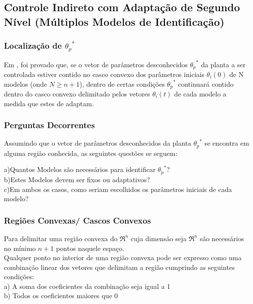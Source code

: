 \documentclass[aspectratio=169]{beamer}
\begin{document}
\subsection{Controle Indireto com Adaptação de Segundo Nível (Múltiplos Modelos de Identificação)}

\begin{frame}
\frametitle{Localização de ${\theta_p}^*$}

Em \cite{han1}, foi provado que, se o vetor de parâmetros desconhecidos ${\theta_p}^*$ da planta a ser controlada estiver contido no casco convexo dos parâmetros iniciais $\theta_i(0)$ de N modelos (onde $N\geq n+1$), dentro de certas condições ${\theta_p}^*$ continuará contido dentro do casco convexo delimitado pelos vetores $\theta_i(t)$ de cada modelo a medida que estes de adaptam.

\end{frame}

\begin{frame}
\frametitle{Perguntas Decorrentes}

Assumindo que o vetor de parâmetros desconhecidos da planta ${\theta_p}^*$ se encontra em alguma região conhecida, as seguintes questões se seguem:

a)Quantos Modelos são necessários para identificar ${\theta_p}^*$?\\
b)Estes Modelos devem ser fixos ou adaptativos?\\
c)Em ambos os casos, como seriam escolhidos os parâmetros iniciais de cada modelo?\\

\end{frame}

\begin{frame}
\frametitle{Regiões Convexas/ Cascos Convexos}
Para delimitar uma região convexa do $\Re^n$ cuja dimensão seja $\Re^n$ são necessários no mínimo $n+1$ pontos naquele espaço.\\

Qualquer ponto no interior de uma região convexa pode ser expresso como uma combinação linear dos vetores que delimitam a região cumprindo as seguintes condições:\\ 

a) A soma dos coeficientes da combinação seja igual a 1\\ 
b) Todos os coeficientes maiores que 0\\

\end{frame}
\end{document}

